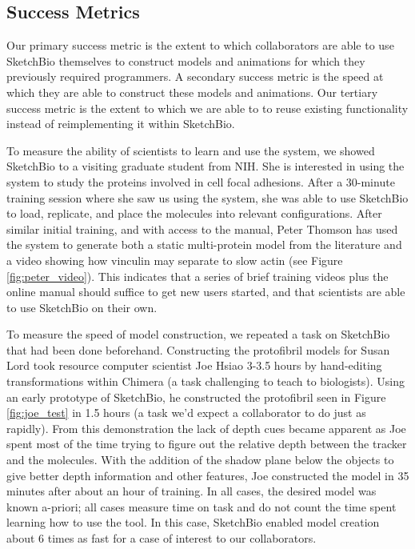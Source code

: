 \documentclass[twocolumn]{bmcart}%
\begin{document}
\subsection*{Success Metrics}
Our primary success metric is the extent to which collaborators are able to use SketchBio themselves to construct models and animations for which they previously required programmers.
A secondary success metric is the speed at which they are able to construct these models and animations.
Our tertiary success metric is the extent to which we are able to to reuse existing functionality instead of reimplementing it within SketchBio.

To measure the ability of scientists to learn and use the system, we showed SketchBio to a visiting graduate student from NIH.  She is interested in using the system to study the proteins involved in cell focal adhesions.
After a 30-minute training session where she saw us using the system, she was able to use SketchBio to load, replicate, and place the molecules into relevant configurations.
After similar initial training, and with access to the manual, Peter Thomson has used the system to generate both a static multi-protein model from the literature and a video showing how vinculin may separate to slow actin (see Figure \ref{fig:peter_video}).
This indicates that a series of brief training videos plus the online manual should suffice to get new users started, and that scientists are able to use SketchBio on their own.

To measure the speed of model construction, we repeated a task on SketchBio that had been done beforehand.
Constructing the protofibril models for Susan Lord took resource computer scientist Joe Hsiao 3-3.5 hours by hand-editing transformations within Chimera (a task challenging to teach to biologists).
Using an early prototype of SketchBio, he constructed the protofibril seen in Figure \ref{fig:joe_test} in 1.5 hours (a task we'd expect a collaborator to do just as rapidly).
From this demonstration the lack of depth cues became apparent as Joe spent most of the time trying to figure out the relative depth between the tracker and the molecules.
With the addition of the shadow plane below the objects to give better depth information and other features, Joe constructed the model in 35 minutes after about an hour of training.
In all cases, the desired model was known a-priori; all cases measure time on task and do not count the time spent learning how to use the tool.
In this case, SketchBio enabled model creation about 6 times as fast for a case of interest to our collaborators.
\end{document}
